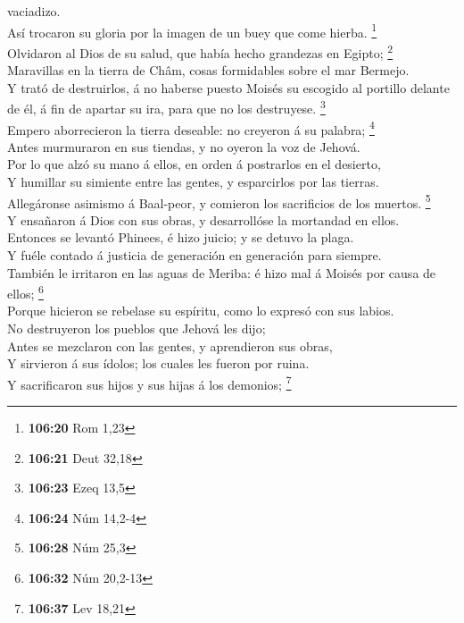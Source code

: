 vaciadizo.\\
 Así trocaron su gloria por la imagen de un buey que come
hierba. \footnote{\textbf{106:20} Rom 1,23}\\
 Olvidaron al Dios de su salud, que había hecho grandezas
en Egipto; \footnote{\textbf{106:21} Deut 32,18}\\
 Maravillas en la tierra de Châm, cosas formidables sobre
el mar Bermejo.\\
 Y trató de destruirlos, á no haberse puesto Moisés su
escogido al portillo delante de él, á fin de apartar su ira, para que no
los destruyese. \footnote{\textbf{106:23} Ezeq 13,5}\\
 Empero aborrecieron la tierra deseable: no creyeron á su
palabra; \footnote{\textbf{106:24} Núm 14,2-4}\\
 Antes murmuraron en sus tiendas, y no oyeron la voz de
Jehová.\\
 Por lo que alzó su mano á ellos, en orden á postrarlos en
el desierto,\\
 Y humillar su simiente entre las gentes, y esparcirlos por
las tierras.\\
 Allegáronse asimismo á Baal-peor, y comieron los
sacrificios de los muertos. \footnote{\textbf{106:28} Núm 25,3}\\
 Y ensañaron á Dios con sus obras, y desarrollóse la
mortandad en ellos.\\
 Entonces se levantó Phinees, é hizo juicio; y se detuvo la
plaga.\\
 Y fuéle contado á justicia de generación en generación
para siempre.\\
 También le irritaron en las aguas de Meriba: é hizo mal á
Moisés por causa de ellos; \footnote{\textbf{106:32} Núm 20,2-13}\\
 Porque hicieron se rebelase su espíritu, como lo expresó
con sus labios.\\
 No destruyeron los pueblos que Jehová les dijo;\\
 Antes se mezclaron con las gentes, y aprendieron sus
obras,\\
 Y sirvieron á sus ídolos; los cuales les fueron por
ruina.\\
 Y sacrificaron sus hijos y sus hijas á los demonios;
\footnote{\textbf{106:37} Lev 18,21}\\
